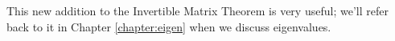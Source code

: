 \smallskip

This new addition to the Invertible Matrix Theorem is very useful; we'll refer back to it in Chapter \ref{chapter:eigen} when we discuss eigenvalues.








